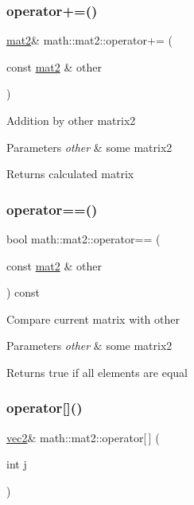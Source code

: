 \subsubsection{\texorpdfstring{operator+=()}{operator+=()}}
{\footnotesize\ttfamily \hyperlink{structmath_1_1mat2}{mat2}\& math\+::mat2\+::operator+= (\begin{DoxyParamCaption}\item[{const \hyperlink{structmath_1_1mat2}{mat2} \&}]{other }\end{DoxyParamCaption})\hspace{0.3cm}{\ttfamily [inline]}}

Addition by other matrix2 
\begin{DoxyParams}{Parameters}
{\em other} & some matrix2 \\
\hline
\end{DoxyParams}
\begin{DoxyReturn}{Returns}
calculated matrix 
\end{DoxyReturn}
\mbox{\label{structmath_1_1mat2_a86e3e0f8ba4337a1ff13069df2ce77b4}} 
\subsubsection{\texorpdfstring{operator==()}{operator==()}}
{\footnotesize\ttfamily bool math\+::mat2\+::operator== (\begin{DoxyParamCaption}\item[{const \hyperlink{structmath_1_1mat2}{mat2} \&}]{other }\end{DoxyParamCaption}) const\hspace{0.3cm}{\ttfamily [inline]}}

Compare current matrix with other 
\begin{DoxyParams}{Parameters}
{\em other} & some matrix2 \\
\hline
\end{DoxyParams}
\begin{DoxyReturn}{Returns}
true if all elements are equal 
\end{DoxyReturn}
\mbox{\label{structmath_1_1mat2_a551cb5e3066d2012a9efa3f78f261f4e}} 
\subsubsection{\texorpdfstring{operator[]()}{operator[]()}\hspace{0.1cm}{\footnotesize\ttfamily [1/2]}}
{\footnotesize\ttfamily \hyperlink{structmath_1_1vec2}{vec2}\& math\+::mat2\+::operator\mbox{[}$\,$\mbox{]} (\begin{DoxyParamCaption}\item[{int}]{j }\end{DoxyParamCaption})\hspace{0.3cm}{\ttfamily [inline]}}

